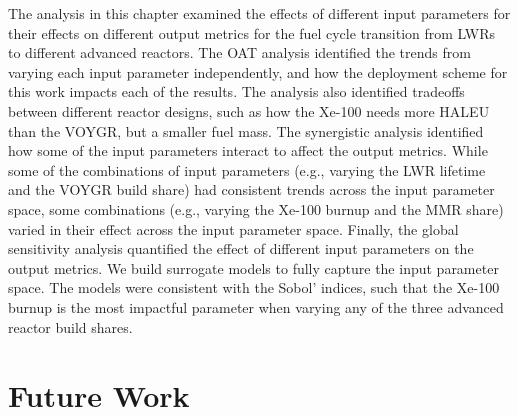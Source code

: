 


The analysis in this chapter examined the effects of different input parameters for 
their effects on different output metrics for the fuel cycle transition from 
\glspl{LWR} to different advanced reactors. The \gls{OAT} analysis identified the 
trends from varying each input parameter independently, and how the deployment 
scheme for this work impacts each of the results. The analysis also 
identified tradeoffs between different reactor designs, such as how the Xe-100 
needs more \gls{HALEU} than the VOYGR, but a smaller fuel mass. The synergistic 
analysis identified how some of the input parameters interact to affect the output 
metrics. While some of the combinations of input parameters (e.g., varying 
the \gls{LWR} lifetime and the VOYGR build share) had consistent trends 
across the input parameter space, some combinations (e.g., varying the Xe-100 
burnup and the \gls{MMR} share) varied in their effect across the input parameter 
space. Finally, the global sensitivity analysis quantified the effect of different 
input parameters on the output metrics. We build surrogate models to fully capture 
the input parameter space. The models were consistent with the Sobol' indices, 
such that the Xe-100 burnup is the most impactful parameter when varying any 
of the three advanced reactor build shares. 



\section{Future Work}